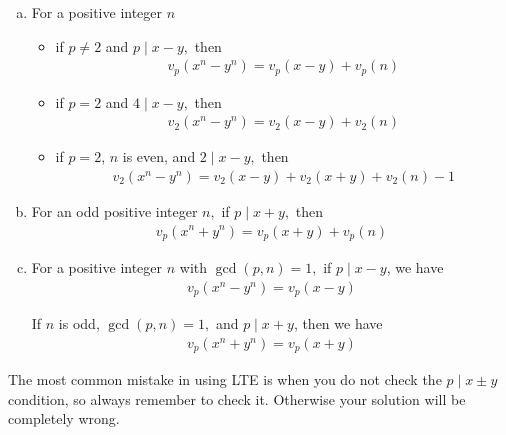     \begin{enumerate}[(a)]
        \item  For a positive integer $n$
            \begin{itemize}
                \item if $p \neq 2$ and $p \mid x-y,$ then
                 \begin{align*}
                 v_p\left(  x^n - y^n \right) = v_p(  x - y ) + v_p(  n )
                 \end{align*}

                \item if $p=2$ and $4 \mid x-y,$ then
                \begin{align*}
                 v_2\left(  x^n - y^n \right) = v_2(  x-y ) + v_2(  n )
                \end{align*}

                \item if $p=2$, $n$ is even, and $2\mid x-y,$ then
                \begin{align*}
                v_2\left(  x^n - y^n \right) = v_2(  x - y )+v_2(  x + y )+v_2(  n )-1
                \end{align*}
            \end{itemize}

        \item For an odd positive integer $n,$ if $p \mid x+y,$ then
	            \begin{align*}
                 v_p\left(  x^n + y^n \right) = v_p(  x + y ) + v_p(  n )
                 \end{align*}

        \item For a positive integer $n$ with $\gcd(p,n)=1,$ if $p\mid x-y$, we have
         \begin{align*}
         v_p\left(  x^n - y^n \right) = v_p(  x - y )
         \end{align*}
        \par If $n$ is odd, $\gcd(p,n)=1,$ and $p\mid x+y$, then we have
		\begin{align*}
		v_p\left(  x^n + y^n \right) = v_p(  x + y )
		\end{align*}

    \end{enumerate}

    \begin{note}
        The most common mistake in using LTE is when you do not check the $p \mid x \pm y$ condition, so always remember to check it. Otherwise your solution will be completely wrong.
    \end{note}

